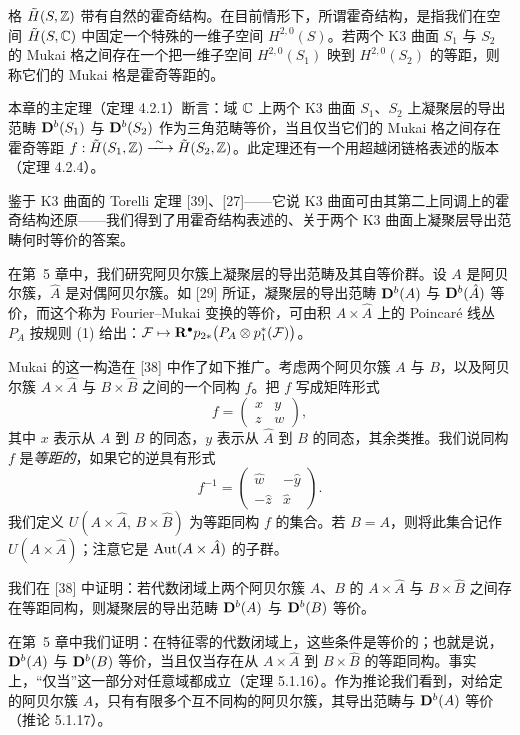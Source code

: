 格 $\tilde H(S,\mathbb{Z})$ 带有自然的霍奇结构。在目前情形下，所谓霍奇结构，是指我们在空间 $\tilde H(S,\mathbb{C})$ 中固定一个特殊的一维子空间 $H^{2,0}(S)$。若两个 K3 曲面 $S_1$ 与 $S_2$ 的 Mukai 格之间存在一个把一维子空间 $H^{2,0}(S_1)$ 映到 $H^{2,0}(S_2)$ 的等距，则称它们的 Mukai 格是霍奇等距的。

本章的主定理（定理 4.2.1）断言：域 $\mathbb{C}$ 上两个 K3 曲面 $S_1$、$S_2$ 上凝聚层的导出范畴 $\mathbf{D}^{b}(S_1)$ 与 $\mathbf{D}^{b}(S_2)$ 作为三角范畴等价，当且仅当它们的 Mukai 格之间存在霍奇等距 $f:\tilde H(S_1,\mathbb{Z})\xrightarrow{\ \sim\ }\tilde H(S_2,\mathbb{Z})$。此定理还有一个用超越闭链格表述的版本（定理 4.2.4）。

鉴于 K3 曲面的 Torelli 定理 [39]、[27]——它说 K3 曲面可由其第二上同调上的霍奇结构还原——我们得到了用霍奇结构表述的、关于两个 K3 曲面上凝聚层导出范畴何时等价的答案。

在第~5 章中，我们研究阿贝尔簇上凝聚层的导出范畴及其自等价群。设 $A$ 是阿贝尔簇，$\hat A$ 是对偶阿贝尔簇。如 [29] 所证，凝聚层的导出范畴 $\mathbf{D}^{b}(A)$ 与 $\mathbf{D}^{b}(\hat A)$ 等价，而这个称为 Fourier--Mukai 变换的等价，可由积 $A\times\hat A$ 上的 Poincar\'e 线丛 $P_A$ 按规则 (1) 给出：$\mathcal{F}\mapsto \mathbf{R}^{\bullet} p_{2*}\bigl(P_A\otimes p_1^*(\mathcal{F})\bigr)$。

Mukai 的这一构造在 [38] 中作了如下推广。考虑两个阿贝尔簇 $A$ 与 $B$，以及阿贝尔簇 $A\times\hat A$ 与 $B\times\hat B$ 之间的一个同构 $f$。把 $f$ 写成矩阵形式
\begin{equation*}
f=\begin{pmatrix} x & y\\ z & w\end{pmatrix},
\end{equation*}
其中 $x$ 表示从 $A$ 到 $B$ 的同态，$y$ 表示从 $\hat A$ 到 $B$ 的同态，其余类推。我们说同构 $f$ 是\emph{等距的}，如果它的逆具有形式
\begin{equation*}
f^{-1}=\begin{pmatrix} \hat w & -\hat y\\ -\hat z & \hat x\end{pmatrix}.
\end{equation*}
我们定义 $U(A\times\hat A,\,B\times\hat B)$ 为等距同构 $f$ 的集合。若 $B=A$，则将此集合记作 $U(A\times\hat A)$；注意它是 $\operatorname{Aut}(A\times\hat A)$ 的子群。

我们在 [38] 中证明：若代数闭域上两个阿贝尔簇 $A$、$B$ 的 $A\times\hat A$ 与 $B\times\hat B$ 之间存在等距同构，则凝聚层的导出范畴 $\mathbf{D}^{b}(A)$ 与 $\mathbf{D}^{b}(B)$ 等价。

在第~5 章中我们证明：在特征零的代数闭域上，这些条件是等价的；也就是说，$\mathbf{D}^{b}(A)$ 与 $\mathbf{D}^{b}(B)$ 等价，当且仅当存在从 $A\times\hat A$ 到 $B\times\hat B$ 的等距同构。事实上，“仅当”这一部分对任意域都成立（定理 5.1.16）。作为推论我们看到，对给定的阿贝尔簇 $A$，只有有限多个互不同构的阿贝尔簇，其导出范畴与 $\mathbf{D}^{b}(A)$ 等价（推论 5.1.17）。

